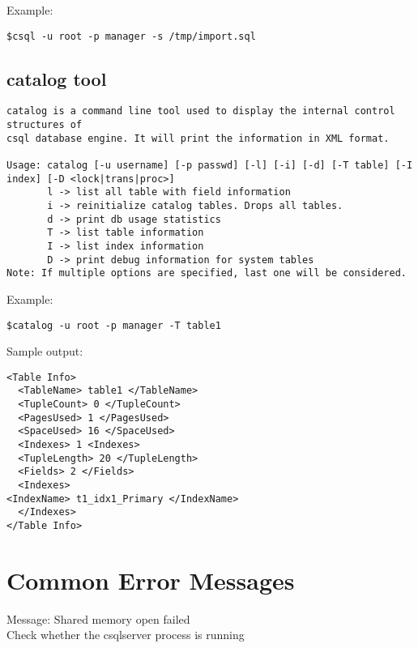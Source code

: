 \documentclass[12pt]{article}
\begin{document}
Example: 
\begin{verbatim}
$csql -u root -p manager -s /tmp/import.sql
\end{verbatim}

\subsection{catalog tool}
\label{catalogtool}
\begin{verbatim}
catalog is a command line tool used to display the internal control structures of 
csql database engine. It will print the information in XML format.

Usage: catalog [-u username] [-p passwd] [-l] [-i] [-d] [-T table] [-I index] [-D <lock|trans|proc>]
       l -> list all table with field information
       i -> reinitialize catalog tables. Drops all tables.
       d -> print db usage statistics
       T -> list table information
       I -> list index information
       D -> print debug information for system tables
Note: If multiple options are specified, last one will be considered.
\end{verbatim}

Example: 
\begin{verbatim}
$catalog -u root -p manager -T table1
\end{verbatim}
Sample output:
\begin{verbatim}
<Table Info> 
  <TableName> table1 </TableName>
  <TupleCount> 0 </TupleCount>
  <PagesUsed> 1 </PagesUsed>
  <SpaceUsed> 16 </SpaceUsed>
  <Indexes> 1 <Indexes>
  <TupleLength> 20 </TupleLength>
  <Fields> 2 </Fields>
  <Indexes>
<IndexName> t1_idx1_Primary </IndexName>
  </Indexes>
</Table Info> 
\end{verbatim}

\section{Common Error Messages}
\label{errormessages}
Message: Shared memory open failed  \\
Check whether the csqlserver process is running \\

\end{document}
